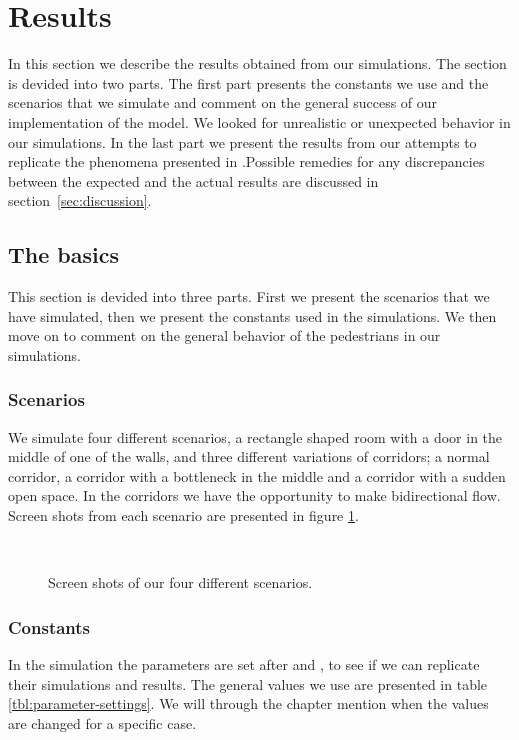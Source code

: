 \section{Results}
\label{sec:results}
In this section we describe the results obtained from our simulations.
The section is devided into two parts. The first part presents the 
constants we use and the scenarios that we simulate and comment on 
the general success of our implementation of the model. We looked 
for unrealistic or unexpected behavior in our simulations. In the 
last part we present the results from our attempts to replicate 
the phenomena presented in \cite{self-org}.Possible remedies for 
any discrepancies between the expected and the actual results are 
discussed in section~\ref{sec:discussion}.

\subsection{The basics}
This section is devided into three parts. First we present the 
scenarios that we have simulated, then we present the constants 
used in the simulations. We then move on to comment on the 
general behavior of the pedestrians in our simulations.

\subsubsection{Scenarios}
We simulate four different scenarios, a rectangle shaped room with a 
door in the middle of one of the walls, and three different variations 
of corridors; a normal corridor, a corridor with a bottleneck in the 
middle and a corridor with a sudden open space. In the corridors we have 
the opportunity to make bidirectional flow. Screen shots from each 
scenario are presented in figure \ref{fig:fourcases}.

\begin{figure}[h]
\centering
{}
\subfloat[Bottleneck.]{\resizebox{7cm}{!}{}}\\
\subfloat[Corridor.]{\resizebox{7cm}{!}{}}
\caption{Screen shots of our four different scenarios.}
\label{fig:fourcases}
\end{figure}

\subsubsection{Constants}
In the simulation the parameters are set after \cite{ABconstant} and 
\cite{self-org}, to see if we can replicate their simulations and results. 
The general values we use are presented in table \ref{tbl:parameter-settings}.
We will through the chapter mention when the values are changed for a
specific case.

